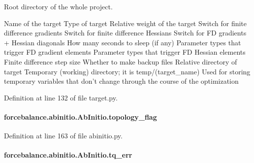 Root directory of the whole project. 

Name of the target Type of target Relative weight of the target Switch for finite difference gradients Switch for finite difference Hessians Switch for F\-D gradients + Hessian diagonals How many seconds to sleep (if any) Parameter types that trigger F\-D gradient elements Parameter types that trigger F\-D Hessian elements Finite difference step size Whether to make backup files Relative directory of target Temporary (working) directory; it is temp/(target\-\_\-name) Used for storing temporary variables that don't change through the course of the optimization 

Definition at line 132 of file target.\-py.

\hypertarget{classforcebalance_1_1abinitio_1_1AbInitio_a09689e626b75720b097c36f922507950}{
\paragraph[{topology\-\_\-flag}]{\setlength{\rightskip}{0pt plus 5cm}forcebalance.\-abinitio.\-Ab\-Initio.\-topology\-\_\-flag\hspace{0.3cm}{\ttfamily [inherited]}}}\label{classforcebalance_1_1abinitio_1_1AbInitio_a09689e626b75720b097c36f922507950}


Definition at line 163 of file abinitio.\-py.

\hypertarget{classforcebalance_1_1abinitio_1_1AbInitio_ae60e834d5b5bf13f8fb70d403a97db28}{
\paragraph[{tq\-\_\-err}]{\setlength{\rightskip}{0pt plus 5cm}forcebalance.\-abinitio.\-Ab\-Initio.\-tq\-\_\-err\hspace{0.3cm}{\ttfamily [inherited]}}}\label{classforcebalance_1_1abinitio_1_1AbInitio_ae60e834d5b5bf13f8fb70d403a97db28}


